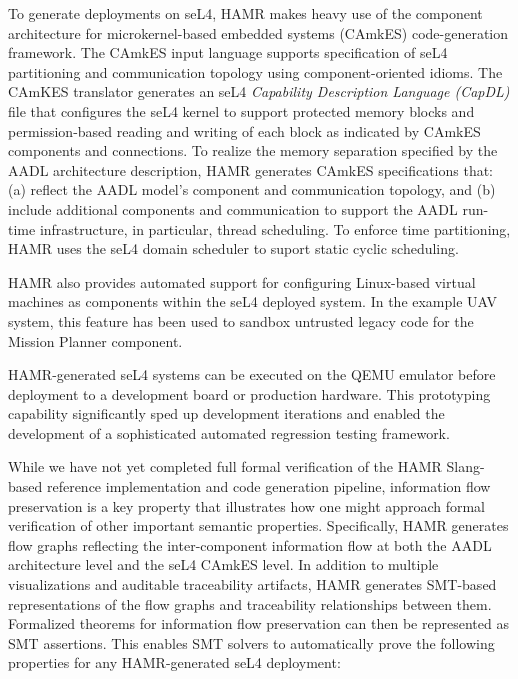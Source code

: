 To generate deployments on seL4, HAMR makes heavy use of the
component architecture for microkernel-based embedded systems
(CAmkES) code-generation framework.   The CAmkES input
language supports specification
of seL4 partitioning and communication topology using
component-oriented idioms.  The CAmKES translator generates an
seL4 \emph{Capability Description Language (CapDL)} file that
configures the seL4 kernel to support protected memory blocks
and permission-based reading and writing of each block as
indicated by CAmkES components and connections.
To realize the memory separation specified by the AADL
architecture description, HAMR generates CAmkES specifications
that: (a) reflect the AADL model's component and communication
topology, and (b) include additional components and communication
to support the AADL run-time infrastructure, in particular,
thread scheduling.
To enforce time partitioning, HAMR uses the seL4 domain
scheduler to suport static cyclic scheduling. 

HAMR also provides automated support for configuring Linux-based
virtual machines as components within the seL4 deployed system. 
In the example UAV system, this feature has been used to sandbox untrusted legacy code
for the Mission Planner component.


HAMR-generated seL4 systems can be executed on the QEMU emulator
before deployment to a development board or
production hardware.  This prototyping capability significantly sped up development
iterations and enabled the development of a sophisticated
automated regression testing framework.

While we have not yet completed full formal verification of
the HAMR Slang-based reference implementation and code generation
pipeline, information flow preservation is a key property that 
illustrates how one might approach formal verification of 
other important semantic properties.
Specifically, HAMR generates flow graphs reflecting the
inter-component information flow at both the AADL architecture
level and the seL4 CAmkES level.  In addition to multiple
visualizations and auditable traceability artifacts, HAMR
generates SMT-based representations of the flow graphs and
traceability relationships between them.  Formalized
theorems for information flow preservation can then be represented as
SMT assertions.  This enables SMT solvers to automatically prove
the following properties for any HAMR-generated seL4 deployment:

